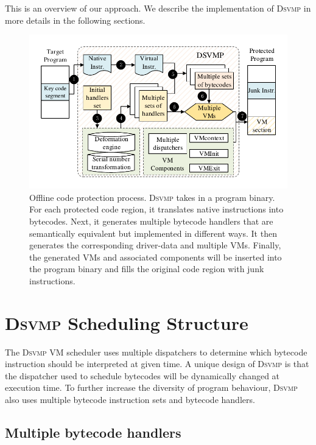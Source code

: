 \documentclass[conference]{IEEEtran}
\newcommand{\DSVMP}{\textsc{Dsvmp}\xspace}
\begin{document}
This is an overview of our approach. We describe the implementation of \DSVMP in more details in the following sections.
\begin{figure}[t]
  \centering
  \includegraphics[width=1.0\columnwidth]{figure/figtwo.pdf}
  \caption{Offline code protection process. \DSVMP takes in a program binary. For each protected code region, it translates native instructions into bytecodes. Next, it generates multiple bytecode handlers that are semantically equivalent but implemented in different ways. It then generates the corresponding driver-data and multiple VMs. Finally, the generated VMs and associated components will be inserted into the program binary and fills the original code region with junk instructions.}\label{fig:Fig.2}
\end{figure}

\section{\DSVMP Scheduling Structure \label{sec:dvs}}

The \DSVMP VM scheduler uses multiple dispatchers to determine which bytecode instruction should be interpreted at given time.
A unique design of \DSVMP is that the dispatcher used to schedule bytecodes will be dynamically changed at execution time. To further increase the diversity of program behaviour, \DSVMP also uses multiple bytecode instruction sets and bytecode handlers.

\subsection{Multiple bytecode handlers \label{sec:mb}}
\end{document}
